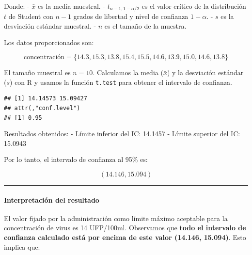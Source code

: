 \documentclass[
]{article}
\newenvironment{Shaded}{\begin{snugshade}}{\end{snugshade}}
\newcommand{\CommentTok}[1]{\textcolor[rgb]{0.56,0.35,0.01}{\textit{#1}}}
\newcommand{\FloatTok}[1]{\textcolor[rgb]{0.00,0.00,0.81}{#1}}
\newcommand{\FunctionTok}[1]{\textcolor[rgb]{0.13,0.29,0.53}{\textbf{#1}}}
\newcommand{\NormalTok}[1]{#1}
\newcommand{\OtherTok}[1]{\textcolor[rgb]{0.56,0.35,0.01}{#1}}
\newcommand{\SpecialCharTok}[1]{\textcolor[rgb]{0.81,0.36,0.00}{\textbf{#1}}}
\begin{document}
Donde:
- \(\bar{x}\) es la media muestral.
- \(t_{n-1, 1-\alpha/2}\) es el valor crítico de la distribución \(t\) de Student con \(n-1\) grados de libertad y nivel de confianza \(1-\alpha\).
- \(s\) es la desviación estándar muestral.
- \(n\) es el tamaño de la muestra.

Los datos proporcionados son:

\[ \text{concentración} = \{14.3, 15.3, 13.8, 15.4, 15.5, 14.6, 13.9, 15.0, 14.6, 13.8\} \]

El tamaño muestral es \(n=10\). Calculamos la media (\(\bar{x}\)) y la desviación estándar (\(s\)) con R y usamos la función \texttt{t.test} para obtener el intervalo de confianza.

\begin{Shaded}
\end{Shaded}

\begin{verbatim}
## [1] 14.14573 15.09427
## attr(,"conf.level")
## [1] 0.95
\end{verbatim}

Resultados obtenidos:
- Límite inferior del IC: 14.1457
- Límite superior del IC: 15.0943

Por lo tanto, el intervalo de confianza al 95\% es:

\[ (14.146, 15.094) \]

\begin{center}\rule{0.5\linewidth}{0.5pt}\end{center}

\paragraph{Interpretación del resultado}\label{interpretaciuxf3n-del-resultado-3}

El valor fijado por la administración como límite máximo aceptable para la concentración de virus es 14 UFP/100ml. Observamos que \textbf{todo el intervalo de confianza calculado está por encima de este valor (14.146, 15.094)}. Esto implica que:
\end{document}
